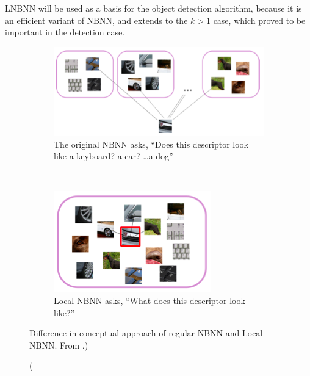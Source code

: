 LNBNN will be used as a basis for the object detection algorithm, because it is an efficient variant of NBNN, and extends to the $k>1$ case, which proved to be important in the detection case.

\begin{figure}[hbt]
    \centering
    \begin{subfigure}[b]{0.45\textwidth}
        \centering
        \includegraphics[width=\textwidth]{LNBNNa}
        \caption{The original NBNN asks, ``Does this descriptor look like a keyboard? a car? \ldots a dog''}
        \label{fig:lnbnna}
    \end{subfigure}%
    ~ %
    \begin{subfigure}[b]{0.45\textwidth}
        \centering
        \includegraphics[width=\textwidth]{LNBNNb}
        \caption{Local NBNN asks, ``What does this descriptor look like?''}
        \label{fig:lnbnnb}
    \end{subfigure}%
    \caption(Difference in conceptual approach of regular NBNN and Local NBNN. From \cite{mccann2012local}.)
    \label{fig:lnbnn}
\end{figure}




